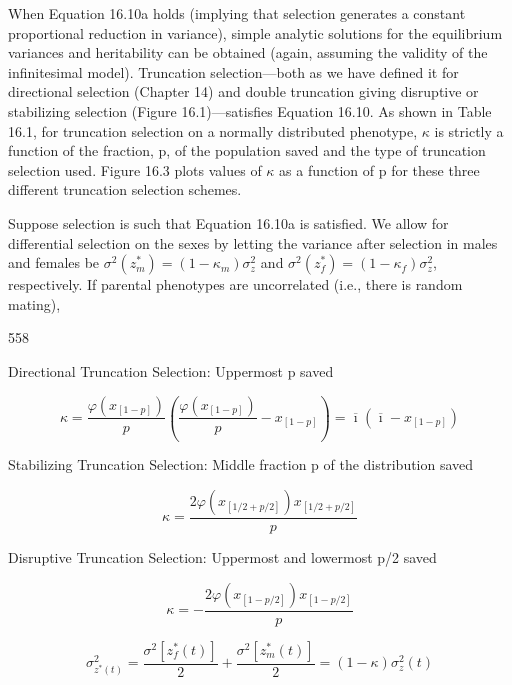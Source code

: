 \documentclass{article}
\begin{document}
When Equation 16.10a holds (implying that selection generates a constant proportional reduction in variance), simple analytic solutions for the equilibrium variances and heritability can be obtained (again, assuming the validity of the infinitesimal model). Truncation selection—both as we have defined it for directional selection (Chapter 14) and double truncation giving disruptive or stabilizing selection (Figure 16.1)—satisfies Equation 16.10. As shown in Table 16.1, for truncation selection on a normally distributed phenotype,  $ \kappa $ is strictly a function of the fraction, p, of the population saved and the type of truncation selection used. Figure 16.3 plots values of  $ \kappa $ as a function of p for these three different truncation selection schemes.

Suppose selection is such that Equation 16.10a is satisfied. We allow for differential selection on the sexes by letting the variance after selection in males and females be  $ \sigma^2(z_m^*) = (1 - \kappa_m)\sigma_z^2 $ and  $ \sigma^2(z_f^*) = (1 - \kappa_f)\sigma_z^2 $, respectively. If parental phenotypes are uncorrelated (i.e., there is random mating),

558

Directional Truncation Selection: Uppermost p saved

\begin{equation}
\kappa=\frac{\varphi\left(x_{[1-p]}\right)}{p}\left(\frac{\varphi\left(x_{[1-p]}\right)}{p}-x_{[1-p]}\right)=\overline{\imath}\left(\overline{\imath}-x_{[1-p]}\right)
\tag{16.11a}
\label{eq:16_11a}
\end{equation}

Stabilizing Truncation Selection: Middle fraction p of the distribution saved

\begin{equation}
\kappa=\frac{2\varphi\left(x_{[1/2+p/2]}\right)x_{[1/2+p/2]}}{p}
\tag{16.11b}
\label{eq:16_11b}
\end{equation}

Disruptive Truncation Selection: Uppermost and lowermost p/2 saved

\begin{equation}
\kappa=-\frac{2\varphi\left(x_{[1-p/2]}\right)x_{[1-p/2]}}{p}
\tag{16.11c}
\label{eq:16_11c}
\end{equation}

\begin{equation}
\sigma_{z^{*}(t)}^{2}=\frac{\sigma^{2}\left[z_{f}^{*}(t)\right]}{2}+\frac{\sigma^{2}\left[z_{m}^{*}(t)\right]}{2}=\left(1-\kappa\right)\sigma_{z}^{2}(t)
\tag{16.12a}
\label{eq:16_12a}
\end{equation}
\end{document}
